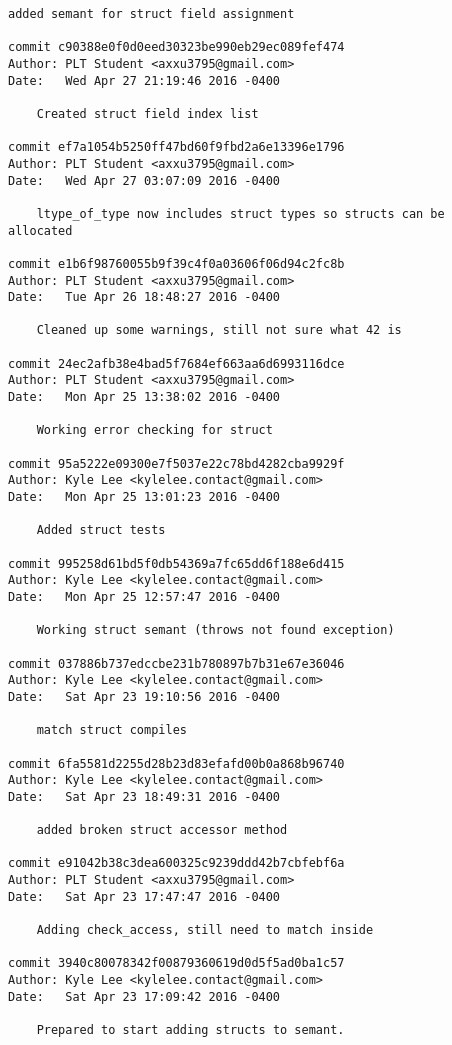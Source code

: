 \begin{lstlisting}[backgroundcolor=\color{white}]
    added semant for struct field assignment

commit c90388e0f0d0eed30323be990eb29ec089fef474
Author: PLT Student <axxu3795@gmail.com>
Date:   Wed Apr 27 21:19:46 2016 -0400

    Created struct field index list

commit ef7a1054b5250ff47bd60f9fbd2a6e13396e1796
Author: PLT Student <axxu3795@gmail.com>
Date:   Wed Apr 27 03:07:09 2016 -0400

    ltype_of_type now includes struct types so structs can be allocated

commit e1b6f98760055b9f39c4f0a03606f06d94c2fc8b
Author: PLT Student <axxu3795@gmail.com>
Date:   Tue Apr 26 18:48:27 2016 -0400

    Cleaned up some warnings, still not sure what 42 is

commit 24ec2afb38e4bad5f7684ef663aa6d6993116dce
Author: PLT Student <axxu3795@gmail.com>
Date:   Mon Apr 25 13:38:02 2016 -0400

    Working error checking for struct

commit 95a5222e09300e7f5037e22c78bd4282cba9929f
Author: Kyle Lee <kylelee.contact@gmail.com>
Date:   Mon Apr 25 13:01:23 2016 -0400

    Added struct tests

commit 995258d61bd5f0db54369a7fc65dd6f188e6d415
Author: Kyle Lee <kylelee.contact@gmail.com>
Date:   Mon Apr 25 12:57:47 2016 -0400

    Working struct semant (throws not found exception)

commit 037886b737edccbe231b780897b7b31e67e36046
Author: Kyle Lee <kylelee.contact@gmail.com>
Date:   Sat Apr 23 19:10:56 2016 -0400

    match struct compiles

commit 6fa5581d2255d28b23d83efafd00b0a868b96740
Author: Kyle Lee <kylelee.contact@gmail.com>
Date:   Sat Apr 23 18:49:31 2016 -0400

    added broken struct accessor method

commit e91042b38c3dea600325c9239ddd42b7cbfebf6a
Author: PLT Student <axxu3795@gmail.com>
Date:   Sat Apr 23 17:47:47 2016 -0400

    Adding check_access, still need to match inside

commit 3940c80078342f00879360619d0d5f5ad0ba1c57
Author: Kyle Lee <kylelee.contact@gmail.com>
Date:   Sat Apr 23 17:09:42 2016 -0400

    Prepared to start adding structs to semant.


\end{lstlisting}
